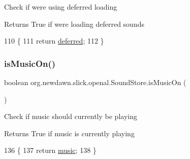 Check if we\textquotesingle{}re using deferred loading

\begin{DoxyReturn}{Returns}
True if we\textquotesingle{}re loading deferred sounds 
\end{DoxyReturn}

\begin{DoxyCode}
110                                        \{
111         \textcolor{keywordflow}{return} \mbox{\hyperlink{classorg_1_1newdawn_1_1slick_1_1openal_1_1_sound_store_a19c18b8305a40c99b51cde881a6f1d32}{deferred}};
112     \}
\end{DoxyCode}
\mbox{\label{classorg_1_1newdawn_1_1slick_1_1openal_1_1_sound_store_a2f3eb7c825a16c900b2caee584fff9b8}} 
\subsubsection{\texorpdfstring{is\+Music\+On()}{isMusicOn()}}
{\footnotesize\ttfamily boolean org.\+newdawn.\+slick.\+openal.\+Sound\+Store.\+is\+Music\+On (\begin{DoxyParamCaption}{ }\end{DoxyParamCaption})\hspace{0.3cm}{\ttfamily [inline]}}

Check if music should currently be playing

\begin{DoxyReturn}{Returns}
True if music is currently playing 
\end{DoxyReturn}

\begin{DoxyCode}
136                                \{
137         \textcolor{keywordflow}{return} \mbox{\hyperlink{classorg_1_1newdawn_1_1slick_1_1openal_1_1_sound_store_a7e15ee371935f6d530e4481ac9e2bd7e}{music}};
138     \}
\end{DoxyCode}
\mbox{\label{classorg_1_1newdawn_1_1slick_1_1openal_1_1_sound_store_a8202e82776ebeb24d157894100fea37b}} 
